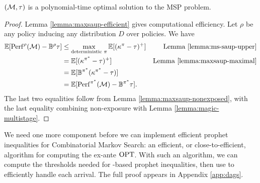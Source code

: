 \begin{proposition} \label{prop:max-saup}
	\MAXSAUP$(\mathcal{M}, \tau)$ is a polynomial-time optimal solution to the MSP \SAUP{} problem.
\end{proposition}

\begin{proof}
	Lemma \ref{lemma:maxsaup-efficient} gives computational efficiency.
	Let $\rho$ be any policy inducing any distribution $D$ over policies.
	We have
	\begin{align*}
		\operatorname*{\mathbb{E}}[\mathrm{Perf}^{\rho}(\mathcal{M}) - \mathbb{B}^\rho\tau]
		&\leq \max_{\text{deterministic }\pi}\operatorname*{\mathbb{E}}[(\kappa^\pi - \tau)^+]   & \text{Lemma \ref{lemma:ms-saup-upper}}  \\
		&=	\operatorname*{\mathbb{E}}[(\kappa^{\pi^*} - \tau)^+]	& \text{Lemma \ref{lemma:maxsaup-maximal}}  \\
		&=	\operatorname*{\mathbb{E}}[\mathbb{B}^{\pi^*}(\kappa^{\pi^*} - \tau)]  \\
		&=	\operatorname*{\mathbb{E}}[ \mathrm{Perf}^{\pi^*}(\mathcal{M}) - \mathbb{B}^{\pi^*} \tau] .
	\end{align*}
	The last two equalities follow from Lemma \ref{lemma:maxsaup-nonexposed}, with the last equality combining non-exposure with Lemma \ref{lemma:magic-multistage}.
\end{proof}

We need one more component before we can implement efficient prophet inequalities for Combinatorial Markov Search: an efficient, or close-to-efficient, algorithm for computing the ex-ante $\mathrm{OPT}$.
With such an algorithm, we can compute the thresholds needed for \SAUP-based prophet inequalities, then use \MAXSAUP{} to efficiently handle each arrival.
The full proof appears in Appendix \ref{app:dags}.

